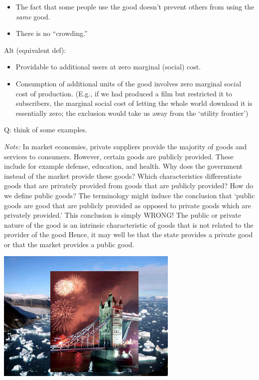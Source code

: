 \documentclass[]{article}
\begin{document}
\begin{itemize}
\item
  The fact that some people use the good doesn't prevent others from
  using the \emph{same} good.
\item
  There is no ``crowding.''
\end{itemize}

Alt (equivalent def):

\begin{itemize}
\item
  Providable to additional users at zero marginal (social) cost.
\item
  Consumption of additional units of the good involves zero marginal
  social cost of production. (E.g., if we had produced a film but
  restricted it to subscribers, the marginal social cost of letting the
  whole world download it is essentially zero; the exclusion would take
  us away from the `utility frontier')
\end{itemize}

Q: think of some examples.

\emph{Note:} In market economies, private suppliers provide the majority
of goods and services to consumers. However, certain goods are publicly
provided. These include for example defense, education, and health. Why
does the government instead of the market provide these goods? Which
characteristics differentiate goods that are privately provided from
goods that are publicly provided? How do we define public goods? The
terminology might induce the conclusion that `public goods are good that
are publicly provided as opposed to private goods which are privately
provided.' This conclusion is simply WRONG! The public or private nature
of the good is an intrinsic characteristic of goods that is not related
to the provider of the good Hence, it may well be that the state
provides a private good or that the market provides a public good.

\includegraphics[height=2.5in]{picsfigs/pubgoodspic.png}
\end{document}
